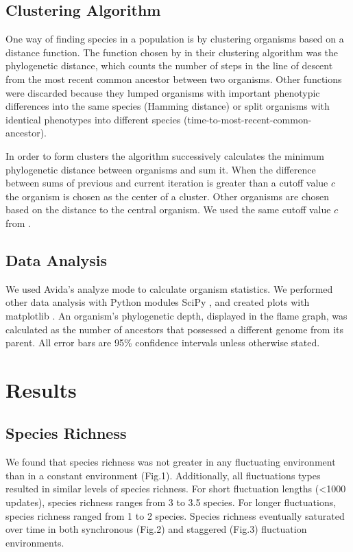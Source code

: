 \documentclass[10pt]{article}
\begin{document}
\subsection{Clustering Algorithm}

One way of finding species in a population is by clustering organisms
based on a distance function.
The function chosen by \cite{chow2004adaptive} in their
clustering algorithm was the phylogenetic distance, which counts the
number of steps in the line of descent from the most recent common ancestor
between two organisms. Other functions were discarded because they
lumped organisms with important phenotypic differences into the same species
(Hamming distance) or split organisms with identical phenotypes into
different species (time-to-most-recent-common-ancestor).

In order to form clusters the algorithm successively calculates the minimum
phylogenetic distance between organisms and sum it. When the difference
between sums of previous and current iteration is greater than a cutoff
value $c$ the organism is chosen as the center of a cluster. Other organisms
are chosen based on the distance to the central organism.
We used the same cutoff value $c$ from \cite{chow2004adaptive}.

\subsection{Data Analysis}

We used Avida's analyze mode to calculate organism statistics. We performed other data analysis with Python modules SciPy \cite{oliphant2007python}, and created plots with matplotlib \cite{hunter2007matplotlib}.
An organism's phylogenetic depth, displayed in the flame graph, was calculated as the number of ancestors that possessed a different genome from its parent.
All error bars are 95\% confidence intervals unless otherwise stated.

\section{Results}

\subsection{Species Richness}

We found that species richness was not greater in any fluctuating environment than in a constant environment (Fig.1). Additionally, all fluctuations types resulted in similar levels of species richness. For short fluctuation lengths (<1000 updates), species richness ranges from 3 to 3.5 species. For longer fluctuations, species richness ranged from 1 to 2 species. Species richness eventually saturated over time in both synchronous (Fig.2) and staggered (Fig.3) fluctuation environments.
\end{document}

